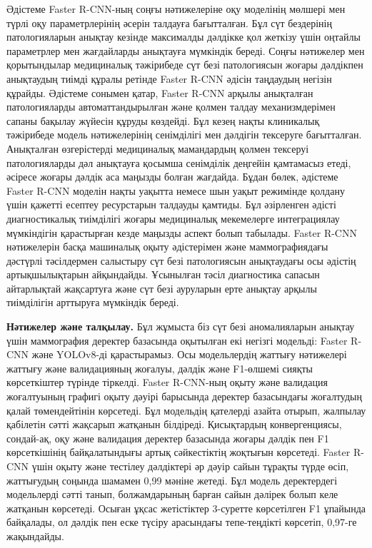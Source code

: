 Әдістеме Faster R-CNN-ның соңғы нәтижелеріне оқу моделінің мөлшері мен
түрлі оқу параметрлерінің әсерін талдауға бағытталған. Бұл сүт
бездерінің патологияларын анықтау кезінде максималды дәлдікке қол
жеткізу үшін оңтайлы параметрлер мен жағдайларды анықтауға мүмкіндік
береді. Соңғы нәтижелер мен қорытындылар медициналық тәжірибеде сүт безі
патологиясын жоғары дәлдікпен анықтаудың тиімді құралы ретінде Faster
R-CNN әдісін таңдаудың негізін құрайды. Әдістеме сонымен қатар, Faster
R-CNN арқылы анықталған патологияларды автоматтандырылған және қолмен
талдау механизмдерімен сапаны бақылау жүйесін құруды көздейді. Бұл кезең
нақты клиникалық тәжірибеде модель нәтижелерінің сенімділігі мен
дәлдігін тексеруге бағытталған. Анықталған өзгерістерді медициналық
мамандардың қолмен тексеруі патологияларды дәл анықтауға қосымша
сенімділік деңгейін қамтамасыз етеді, әсіресе жоғары дәлдік аса маңызды
болған жағдайда. Бұдан бөлек, әдістеме Faster R-CNN моделін нақты
уақытта немесе шын уақыт режимінде қолдану үшін қажетті есептеу
ресурстарын талдауды қамтиды. Бұл әзірленген әдісті диагностикалық
тиімділігі жоғары медициналық мекемелерге интеграциялау мүмкіндігін
қарастырған кезде маңызды аспект болып табылады. Faster R-CNN
нәтижелерін басқа машиналық оқыту әдістерімен және маммографиядағы
дәстүрлі тәсілдермен салыстыру сүт безі патологиясын анықтаудағы осы
әдістің артықшылықтарын айқындайды. Ұсынылған тәсіл диагностика сапасын
айтарлықтай жақсартуға және сүт безі ауруларын ерте анықтау арқылы
тиімділігін арттыруға мүмкіндік береді.

{\bfseries Нәтижелер және талқылау.} Бұл жұмыста біз сүт безі аномалияларын
анықтау үшін маммография деректер базасында оқытылған екі негізгі
модельді: Faster R-CNN және YOLOv8-ді қарастырамыз. Осы модельлердің
жаттығу нәтижелері жаттығу және валидацияның жоғалуы, дәлдік және
F1-өлшемі сияқты көрсеткіштер түрінде тіркелді. Faster R-CNN-ның оқыту
және валидация жоғалтуының графигі оқыту дәуірі барысында деректер
базасындағы жоғалтудың қалай төмендейтінін көрсетеді. Бұл модельдің
қателерді азайта отырып, жалпылау қабілетін сәтті жақсарып жатқанын
білдіреді. Қисықтардың конвергенциясы, сондай-ақ, оқу және валидация
деректер базасында жоғары дәлдік пен F1 көрсеткішінің байқалатындығы
артық сәйкестіктің жоқтығын көрсетеді. Faster R-CNN үшін оқыту және
тестілеу дәлдіктері әр дәуір сайын тұрақты түрде өсіп, жаттығудың
соңында шамамен 0,99 мәніне жетеді. Бұл модель деректердегі модельлерді
сәтті танып, болжамдарының барған сайын дәлірек болып келе жатқанын
көрсетеді. Осыған ұқсас жетістіктер 3-суретте көрсетілген F1 ұпайында
байқалады, ол дәлдік пен еске түсіру арасындағы тепе-теңдікті көрсетіп,
0,97-ге жақындайды.

